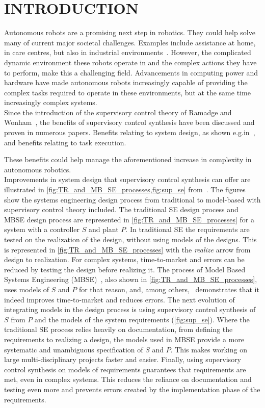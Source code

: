 \section{INTRODUCTION}\label{sec:introduction}

Autonomous robots are a promising next step in robotics. They could help solve many of current major societal challenges. Examples include assistance at home, in care centres, but also in industrial environments~\cite{sup_navigation}.
However, the complicated dynamic environment these robots operate in and the complex actions they have to perform, make this a challenging field. 
Advancements in computing power and hardware have made autonomous robots increasingly capable of providing the complex tasks required to operate in these environments, but at the same time increasingly complex systems.\\ 
Since the introduction of the supervisory control theory of Ramadge and Wonham~\cite{original}, the benefits of supervisory control synthesis have been discussed and proven in numerous papers. Benefits relating to system design, as shown e.g.\@ in~\cite{themepark}, and benefits relating to task execution.

These benefits could help manage the aforementioned increase in complexity in autonomous robotics.\\

Improvements in system design that supervisory control synthesis can offer are illustrated in \cref{fig:TR_and_MB_SE_processes,fig:sup_se} from~\cite{Baeten2016}. 
The figures show the systems engineering design process from traditional to model-based with supervisory control theory included. 
The traditional SE design process and MBSE design process are represented in \cref{fig:TR_and_MB_SE_processes} for a system with a controller \(S\) and plant \(P\).
In traditional SE the requirements are tested on the realization of the design, without using models of the designs.
This is represented in \cref{fig:TR_and_MB_SE_processes} with the \textit{realize} arrow from design to realization.
For complex systems, time-to-market and errors can be reduced by testing the design before realizing it. 
The process of Model Based Systems Engineering (MBSE)~\cite{mbse}, also shown in \cref{fig:TR_and_MB_SE_processes}, uses models of \(S\) and \(P\) for that reason, and, among others,~\cite{themepark} demonstrates that it indeed improves time-to-market and reduces errors.
The next evolution of integrating models in the design process is using supervisory control synthesis of \(S\) from \(P\) and the models of the system requirements (\cref{fig:sup_se}).
Where the traditional SE process relies heavily on documentation, from defining the requirements to realizing a design, the models used in MBSE provide a more systematic and unambiguous specification of \(S\) and \(P\).
This makes working on large multi-disciplinary projects faster and easier.
Finally, using supervisory control synthesis on models of requirements guarantees that requirements are met, even in complex systems.
This reduces the reliance on documentation and testing even more and prevents errors created by the implementation phase of the requirements.\\

